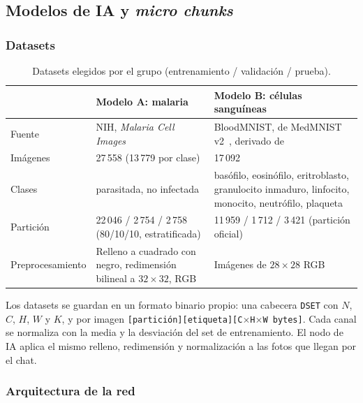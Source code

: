 \documentclass[10pt,a4paper]{article}
\begin{document}
\subsection{Modelos de IA y \textit{micro chunks}}

\subsubsection{Datasets}

\begin{table}[H]
\centering
\small
\begin{tabularx}{\textwidth}{p{3cm}YY}
\toprule
 & \textbf{Modelo A: malaria} & \textbf{Modelo B: células sanguíneas} \\
\midrule
Fuente & NIH, \textit{Malaria Cell Images}~\cite{malaria} & BloodMNIST, de MedMNIST v2~\cite{medmnist}, derivado de~\cite{acevedo} \\
Imágenes & 27\,558 (13\,779 por clase) & 17\,092 \\
Clases & parasitada, no infectada & basófilo, eosinófilo, eritroblasto, granulocito inmaduro, linfocito, monocito, neutrófilo, plaqueta \\
Partición & 22\,046 / 2\,754 / 2\,758 (80/10/10, estratificada) & 11\,959 / 1\,712 / 3\,421 (partición oficial) \\
Preprocesamiento & Relleno a cuadrado con negro, redimensión bilineal a $32 \times 32$, RGB & Imágenes de $28 \times 28$ RGB \\
\bottomrule
\end{tabularx}
\caption{Datasets elegidos por el grupo (entrenamiento / validación / prueba).}
\label{tab:datasets}
\end{table}

Los datasets se guardan en un formato binario propio: una cabecera \texttt{DSET} con $N$, $C$, $H$,
$W$ y $K$, y por imagen \texttt{[partición][etiqueta][C$\times$H$\times$W bytes]}. Cada canal se
normaliza con la media y la desviación del set de entrenamiento. El nodo de IA aplica el mismo relleno,
redimensión y normalización a las fotos que llegan por el chat.

\subsubsection{Arquitectura de la red}
\end{document}
